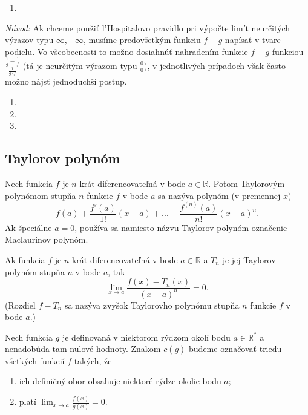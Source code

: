 \begin{enumerate}[resume]
	\item {}
\end{enumerate}

\textit{Návod:}
Ak chceme použiť l'Hospitalovo pravidlo pri výpočte limít neurčitých výrazov typu $\infty,-\infty$, musíme predovšetkým funkciu $f-g$ napísať v tvare podielu. Vo všeobecnosti to možno dosiahnúť nahradením funkcie $f-g$ funkciou $\frac{\frac{1}{g}-\frac{1}{f}}{\frac{1}{g\cdot f}}$ (tá je neurčitým výrazom typu $\frac{0}{0}$), v jednotlivých prípadoch však často možno nájsť jednoduchší postup.

\begin{enumerate}[resume]
	\item {}
	\item {}
	\item {}
\end{enumerate}

\subsection{Taylorov polynóm}
Nech funkcia $f$ je $n$-krát diferencovateľná v bode $a\in\mathbb{R}$. Potom Taylorovým polynómom stupňa $n$ funkcie $f$ v bode $a$ sa nazýva polynóm (v premennej $x$)
$$f(a)+\frac{f'(a)}{1!}(x-a)+...+\frac{f^{(n)}(a)}{n!}(x-a)^n.$$
Ak špeciálne $a=0$, používa sa namiesto názvu Taylorov polynóm označenie Maclaurinov polynóm.

\begin{veta}
Ak funkcia $f$ je $n$-krát diferencovateľná v bode $a\in\mathbb{R}$ a $T_n$ je jej Taylorov polynóm stupňa $n$ v bode $a$, tak $$\lim_{x\rightarrow a}\frac{f(x)-T_n(x)}{(x-a)^n}=0.$$
(Rozdiel $f-T_n$ sa nazýva zvyšok Taylorovho polynómu stupňa $n$ funkcie $f$ v bode $a$.)
\end{veta}

Nech funkcia $g$ je definovaná v niektorom rýdzom okolí bodu $a\in\mathbb{R^*}$ a nenadobúda tam nulové hodnoty. Znakom $c(g)$ budeme označovať triedu všetkých funkcií $f$ takých, že
\begin{enumerate}
\item ich definičný obor obsahuje niektoré rýdze okolie bodu $a$;
\item platí $\lim_{x\rightarrow a}\frac{f(x)}{g(x)}=0$.
\end{enumerate}

